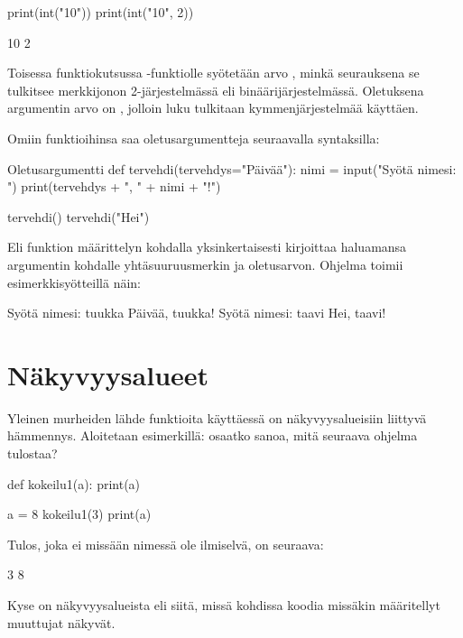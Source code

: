 \begin{python}
print(int("10"))
print(int("10", 2))
\end{python}

\begin{output}
10
2
\end{output}

Toisessa funktiokutsussa -funktiolle syötetään arvo , minkä seurauksena se tulkitsee merkkijonon  2-järjestelmässä eli binäärijärjestelmässä. Oletuksena argumentin arvo on , jolloin luku tulkitaan kymmenjärjestelmää käyttäen.

Omiin funktioihinsa saa oletusargumentteja seuraavalla syntaksilla:

\begin{example}{Oletusargumentti}
def tervehdi(tervehdys="Päivää"):
        nimi = input("Syötä nimesi: ")
        print(tervehdys + ", " + nimi + "!")

tervehdi()
tervehdi("Hei")
\end{example}

Eli funktion määrittelyn kohdalla yksinkertaisesti kirjoittaa haluamansa argumentin kohdalle yhtäsuuruusmerkin ja oletusarvon. Ohjelma toimii esimerkkisyötteillä näin:

\begin{output}
Syötä nimesi: tuukka
Päivää, tuukka!
Syötä nimesi: taavi
Hei, taavi!
\end{output}

\section{Näkyvyysalueet}

Yleinen murheiden lähde funktioita käyttäessä on näkyvyysalueisiin liittyvä hämmennys. Aloitetaan esimerkillä: osaatko sanoa, mitä seuraava ohjelma tulostaa?

\begin{python}
def kokeilu1(a):
        print(a)

a = 8
kokeilu1(3)
print(a)
\end{python}

Tulos, joka ei missään nimessä ole ilmiselvä, on seuraava:

\begin{output}
3
8
\end{output}

Kyse on näkyvyysalueista eli siitä, missä kohdissa koodia missäkin määritellyt muuttujat näkyvät.

